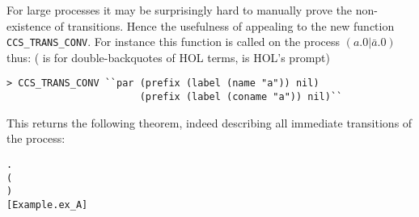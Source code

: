 For large processes it may be surprisingly hard to manually prove the
non-existence of transitions.  Hence the usefulness of appealing to 
the new  function \texttt{CCS\_TRANS\_CONV}. 
For instance this function
is called on the  process $(a.0 | \bar{a}.0)$ thus:
(\mbox{} is for double-backquotes of HOL
  terms, \mbox{\color{blue}{\texttt{>}}} is HOL's prompt)
\begin{lstlisting}
> CCS_TRANS_CONV ``par (prefix (label (name "a")) nil)
                       (prefix (label (coname "a")) nil)``
\end{lstlisting}
This returns the following theorem, indeed describing all immediate
transitions of the process:
\begin{alltt}
\HOLTokenTurnstile{} \HOLSymConst{\HOLTokenForall{}} .
         \HOLSymConst{\ensuremath{\parallel}}   \HOLTokenTransBegin{}\HOLTokenTransEnd {} \HOLSymConst{\HOLTokenEquiv{}}
       ( \HOLSymConst{=}   \HOLSymConst{\HOLTokenConj{}}  \HOLSymConst{=}  \HOLSymConst{\ensuremath{\parallel}}   \HOLSymConst{\HOLTokenDisj{}}
         \HOLSymConst{=}   \HOLSymConst{\HOLTokenConj{}}  \HOLSymConst{=}   \HOLSymConst{\ensuremath{\parallel}} ) \HOLSymConst{\HOLTokenDisj{}}
        \HOLSymConst{=} \HOLSymConst{\ensuremath{\tau}} \HOLSymConst{\HOLTokenConj{}}  \HOLSymConst{=}  \HOLSymConst{\ensuremath{\parallel}} \hfill{[Example.ex_A]}
\end{alltt}

